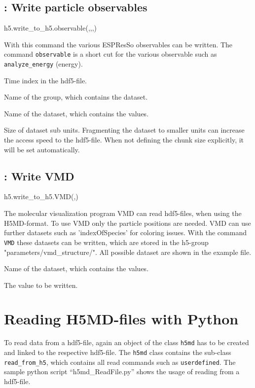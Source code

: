 \subsection{: Write particle observables}
\begin{pyessyntax}
h5.write_to_h5.observable(,,,)
\end{pyessyntax}
With this command the various ESPResSo observables can be written. The command \texttt{observable} is a short cut for the various observable such as \texttt{analyze_energy} (energy).
\begin{arguments}
\item[\var{timestep}] Time index in the hdf5-file.
\item[\var{groupname}] Name of the group, which contains the dataset.
\item[\var{datasetname}] Name of the dataset, which contains the values.
\item[\var{chunks}] Size of dataset sub units. Fragmenting the dataset to smaller units can increase the access speed to the hdf5-file. When not defining the chunk size explicitly, it will be set automatically.
\end{arguments}

\subsection{: Write VMD}
\begin{pyessyntax}
h5.write_to_h5.VMD(,)
\end{pyessyntax}
The molecular visualization program VMD can read hdf5-files, when using the H5MD-format. To use VMD only the particle positions are needed. VMD can use further datasets such as 'indexOfSpecies' for coloring issues. With the command \texttt{VMD} these datasets can be written, which are stored in the h5-group "parameters/vmd_structure/". All possible dataset are shown in the example file.
\begin{arguments}
\item[\var{datasetname}] Name of the dataset, which contains the values.
\item[\var{value}] The value to be written.
\end{arguments}



\section{Reading H5MD-files with Python}
To read data from a hdf5-file, again an object of the class \texttt{h5md} has to be created and linked to the respective hdf5-file. The \texttt{h5md} class contains the sub-class \texttt{read_from_h5}, which contains all read commands such as \texttt{userdefined}. The sample python script ``h5md_ReadFile.py'' shows the usage of reading from a hdf5-file.
